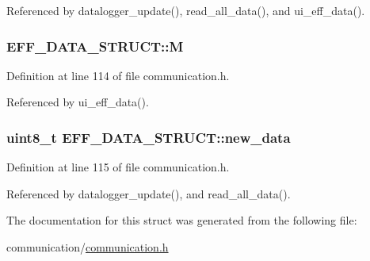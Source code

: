 Referenced by datalogger\_\-update(), read\_\-all\_\-data(), and ui\_\-eff\_\-data().

\hypertarget{structEFF__DATA__STRUCT_aaf6e03b6e600295e0f5c706fc869e9d1}{
\subsubsection[{M}]{ {\bf EFF\_\-DATA\_\-STRUCT::M}}}
\label{structEFF__DATA__STRUCT_aaf6e03b6e600295e0f5c706fc869e9d1}


Definition at line 114 of file communication.h.



Referenced by ui\_\-eff\_\-data().

\hypertarget{structEFF__DATA__STRUCT_aa42ebc512dd79fa6ebf998162a149446}{
\subsubsection[{new\_\-data}]{\setlength{\rightskip}{0pt plus 5cm}uint8\_\-t {\bf EFF\_\-DATA\_\-STRUCT::new\_\-data}}}
\label{structEFF__DATA__STRUCT_aa42ebc512dd79fa6ebf998162a149446}


Definition at line 115 of file communication.h.



Referenced by datalogger\_\-update(), and read\_\-all\_\-data().



The documentation for this struct was generated from the following file:\begin{DoxyCompactItemize}
\item 
communication/\hyperlink{communication_8h}{communication.h}\end{DoxyCompactItemize}
